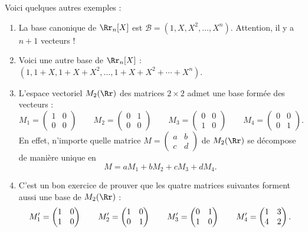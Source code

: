 \documentclass[class=report,crop=false]{standalone}
\begin{document}
Voici quelques autres exemples :
\begin{exemple}
\sauteligne
\begin{enumerate}
  \item La base canonique de $\Rr_n[X]$ est $\mathcal{B} = (1,X,X^2, \ldots , X^n)$.
  Attention, il y a $n+1$ vecteurs !

  \item Voici une autre base de $\Rr_n[X]$ :
  $(1,1+X,1+X+X^2,\ldots,1+X+X^2+\cdots+X^n)$.

  \item L'espace vectoriel $M_2(\Rr)$ des matrices $2\times2$ admet une base formée
  des vecteurs :
$$
M_1 = \begin{pmatrix} 1 & 0 \\ 0 & 0 \end{pmatrix} \qquad
M_2 = \begin{pmatrix} 0 & 1 \\ 0 & 0 \end{pmatrix} \qquad
M_3 = \begin{pmatrix} 0 & 0 \\ 1 & 0 \end{pmatrix} \qquad
M_4 = \begin{pmatrix} 0 & 0 \\ 0 & 1 \end{pmatrix}.
$$
En effet, n'importe quelle matrice
$M=\left(\begin{matrix}a & b\\ c & d\end{matrix}\right)$
de $M_2(\Rr)$ se décompose de manière unique en
$$M = a M_1 + bM_2 +  c M_3 + d M_4.$$

  \item C'est un bon exercice de prouver que les quatre matrices suivantes
  forment aussi une base de $M_2(\Rr)$ :
$$M'_1=\begin{pmatrix}
1 & 0 \cr
1 & 0 \cr
\end{pmatrix} \qquad
M'_2=\begin{pmatrix}
1 & 0 \cr
0 & 1 \cr
\end{pmatrix} \qquad
M'_3=\begin{pmatrix}
0 & 1 \cr
1 & 0 \cr
\end{pmatrix} \qquad
M'_4=\begin{pmatrix}
1 & 3 \cr
4 & 2 \cr
\end{pmatrix}.$$
\end{enumerate}

\end{exemple}
\end{document}
